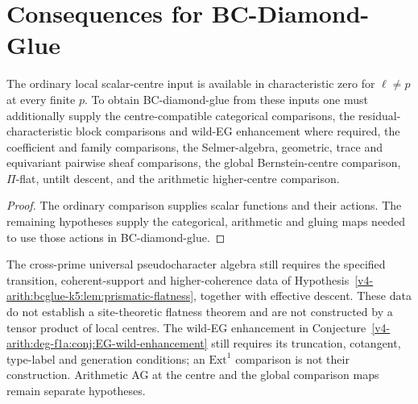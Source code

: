 \section{Consequences for BC-Diamond-Glue}
\label{v4-arith:w10-e:consequences}

\begin{corollary}
\label{v4-arith:w10-e:cor:bcglue-final-updated}
\ClaimStatusProvedHereConditional
The ordinary local scalar-centre input is
available in characteristic zero for
\(\ell\neq p\) at every finite \(p\).
To obtain BC-diamond-glue from these inputs
one must additionally supply the
centre-compatible categorical comparisons,
the residual-characteristic block comparisons
and wild-EG enhancement where required,
the coefficient and family comparisons,
the Selmer-algebra, geometric, trace and
equivariant pairwise sheaf comparisons,
the global Bernstein-centre comparison,
\(\Pi\)-flat, untilt descent,
and the arithmetic higher-centre comparison.
\end{corollary}

\begin{proof}
The ordinary comparison supplies scalar
functions and their actions. The remaining
hypotheses supply the categorical, arithmetic
and gluing maps needed to use those actions
in BC-diamond-glue.
\end{proof}

\begin{remark}
\label{v4-arith:w10-e:rem:residuals-not-closed}
The cross-prime universal pseudocharacter algebra still requires the
specified transition, coherent-support and higher-coherence
data of Hypothesis~\ref{v4-arith:bcglue-k5:lem:prismatic-flatness},
together with effective descent. These data do not establish a
site-theoretic flatness theorem and are not constructed by a tensor
product of local centres.
The wild-EG enhancement in
Conjecture~\ref{v4-arith:deg-f1a:conj:EG-wild-enhancement} still requires its
truncation, cotangent, type-label and generation conditions; an
$\mathrm{Ext}^1$ comparison is not their construction.
Arithmetic AG at the centre and the global comparison maps remain
separate hypotheses.
\end{remark}

